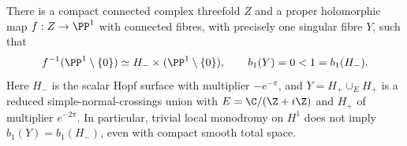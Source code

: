 \begin{proposition}\hypertarget{tag-030L}{}\label{push:src:B.4.17}

There is a compact connected complex threefold $Z$ and a proper
holomorphic map $f:Z\to\PP^1$ with connected fibres, with precisely
one singular fibre $Y$, such that
\[
 f^{-1}(\PP^1\setminus\{0\})
 \simeq H_-\times(\PP^1\setminus\{0\}),\qquad
 b_1(Y)=0<1=b_1(H_-).
\]
Here $H_-$ is the scalar Hopf surface with multiplier $-e^{-\pi}$,
and $Y=H_+\cup_E H_+$ is a reduced simple-normal-crossings union
with $E=\C/(\Z+i\Z)$ and $H_+$ of multiplier $e^{-2\pi}$.
In particular, trivial local monodromy on $H^1$ does not imply
$b_1(Y)=b_1(H_-)$, even with compact smooth total space.
\end{proposition}


